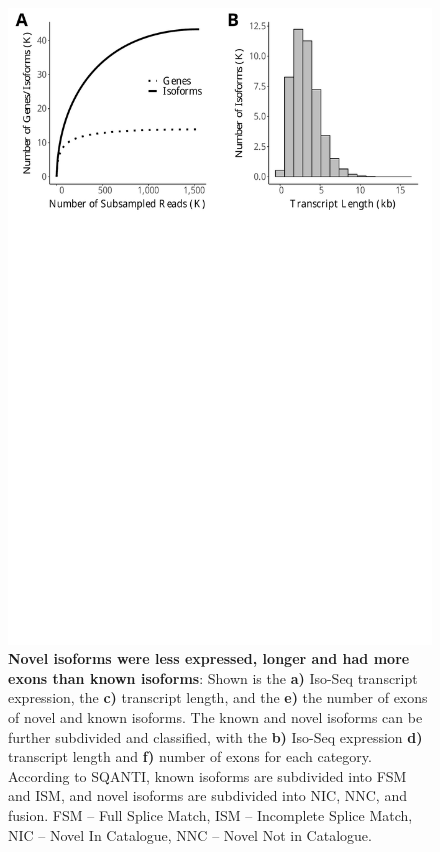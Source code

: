 \begin{figure}[!htp]
	\begin{center}
		\includegraphics[page=4,scale = 0.55]{Figures/IsoSeqWholeTranscriptome.pdf}
	\end{center}
	\captionsetup{width=0.95\textwidth}
	\caption[Comparison of Known and Novel Isoforms from Iso-Seq Whole Transcriptome runs]%
	{\textbf{Novel isoforms were less expressed, longer and had more exons than known isoforms}: Shown is the \textbf{a)} Iso-Seq transcript expression, the \textbf{c)} transcript length, and the \textbf{e)} the number of exons of novel and known isoforms. The known and novel isoforms can be further subdivided and classified, with the \textbf{b)} Iso-Seq expression \textbf{d)} transcript length and \textbf{f)} number of exons for each category. According to SQANTI, known isoforms are subdivided into FSM and ISM, and novel isoforms are subdivided into NIC, NNC, and fusion. FSM – Full Splice Match, ISM – Incomplete Splice Match, NIC – Novel In Catalogue, NNC – Novel Not in Catalogue.}   
	\label{fig:isoseq_whole_novel_known_iso_corr}
\end{figure}


